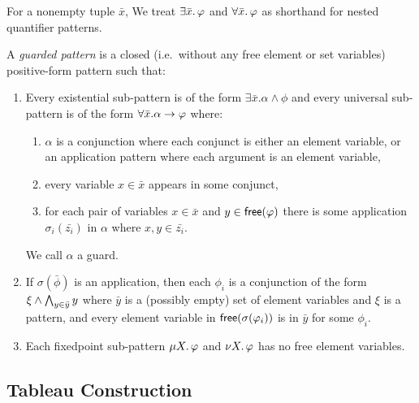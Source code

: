 For a nonempty tuple \(\bar x\),
We treat \(\exists \bar x \ldotp \phi\) and \(\forall \bar x \ldotp \phi\)
as shorthand for nested quantifier patterns.

\begin{definition}A \emph{guarded pattern} is a closed (i.e.~without any free element or set variables)
positive-form pattern such that:

\begin{enumerate}
\def\labelenumi{\arabic{enumi}.}
\item
  Every existential sub-pattern is of the form \(\exists \bar x. \alpha \land \phi\)
  and every universal sub-pattern is of the form \(\forall \bar x. \alpha \limplies \phi\)
  where:

  \begin{enumerate}
  \def\labelenumii{\alph{enumii})}
  \tightlist
  \item
    \(\alpha\) is a conjunction where each conjunct is either an element variable,
    or an application pattern where each argument is an element variable,
  \item
    every variable \(x \in \bar x\) appears in some conjunct,
  \item
    for each pair of variables \(x \in \bar x\) and \(y \in \free{\phi}\)
    there is some application \(\sigma_i(\bar {z_i})\) in \(\alpha\) where \(x, y \in \bar {z_i}\).
    \label{gp:xxx}
  \end{enumerate}

  We call \(\alpha\) a guard.
\item
  If \(\sigma(\bar\phi)\) is an application, then
  each \(\phi_i\) is a conjunction of the form \(\xi \land \lAnd_{y \in \bar y} y\)
  where \(\bar y\) is a (possibly empty) set of element variables and \(\xi\) is a pattern,
  and every element variable in \(\free{\sigma(\phi_i)}\)
  is in \(\bar y\) for some \(\phi_i\).
\item
  \label{item:fixedpoint-no-elements}
  Each fixedpoint sub-pattern \(\mu X \ldotp \phi\) and \(\nu X \ldotp \phi\) has no free element variables.
\end{enumerate}

\end{definition}

\hypertarget{tableau-construction}{%
\subsection{Tableau Construction}\label{tableau-construction}}

